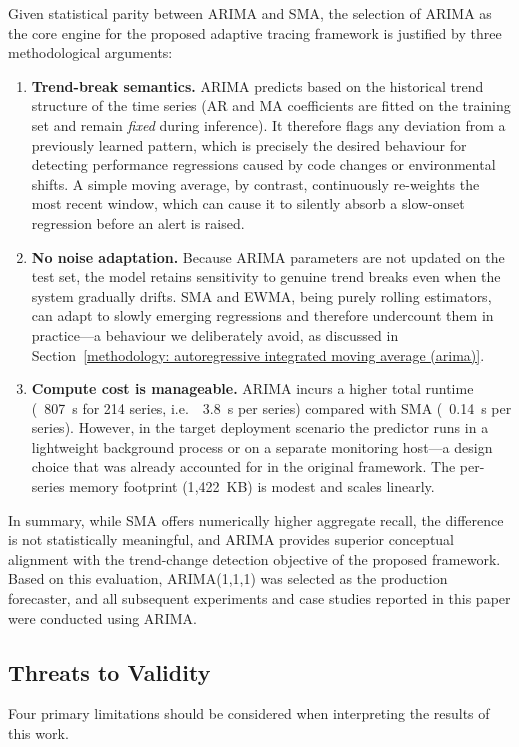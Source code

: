 \documentclass[pdflatex,sn-nature]{sn-jnl}%
\theoremstyle{thmstyleone}%
\theoremstyle{thmstyletwo}%
\theoremstyle{thmstylethree}%
\begin{document}
Given statistical parity between ARIMA and SMA, the selection of ARIMA as the core engine for the proposed adaptive tracing framework is justified by three methodological arguments:

\begin{enumerate}
  \item \textbf{Trend-break semantics.} ARIMA predicts based on the historical trend structure of the time series (AR and MA coefficients are fitted on the training set and remain \textit{fixed} during inference). It therefore flags any deviation from a previously learned pattern, which is precisely the desired behaviour for detecting performance regressions caused by code changes or environmental shifts. A simple moving average, by contrast, continuously re-weights the most recent window, which can cause it to silently absorb a slow-onset regression before an alert is raised.
  \item \textbf{No noise adaptation.} Because ARIMA parameters are not updated on the test set, the model retains sensitivity to genuine trend breaks even when the system gradually drifts. SMA and EWMA, being purely rolling estimators, can adapt to slowly emerging regressions and therefore undercount them in practice---a behaviour we deliberately avoid, as discussed in Section~\ref{methodology: autoregressive integrated moving average (arima)}.
  \item \textbf{Compute cost is manageable.} ARIMA incurs a higher total runtime (~807~s for 214 series, i.e.\ ~3.8~s per series) compared with SMA (~0.14~s per series). However, in the target deployment scenario the predictor runs in a lightweight background process or on a separate monitoring host---a design choice that was already accounted for in the original framework. The per-series memory footprint (1{,}422~KB) is modest and scales linearly.
\end{enumerate}

In summary, while SMA offers numerically higher aggregate recall, the difference is not statistically meaningful, and ARIMA provides superior conceptual alignment with the trend-change detection objective of the proposed framework. Based on this evaluation, ARIMA(1,1,1) was selected as the production forecaster, and all subsequent experiments and case studies reported in this paper were conducted using ARIMA.

\subsection{Threats to Validity}
Four primary limitations should be considered when interpreting the results of this work.
\end{document}
